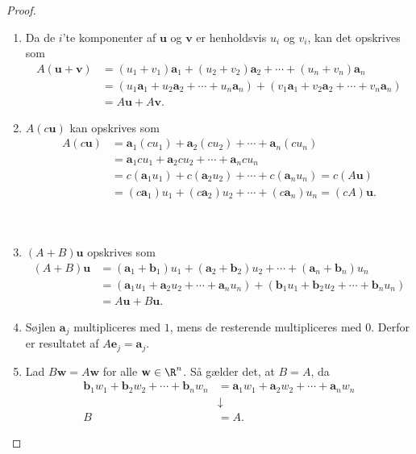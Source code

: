 \begin{proof}
\begin{enumerate}[label=(\alph*)]
\item Da de $i$'te komponenter af $\textbf{u}$ og $\textbf{v}$ er henholdsvis $u_i$ og $v_i$, kan det opskrives som
\begin{align*}
A(\mathbf{u}+\mathbf{v})&=(u_1+v_1)\mathbf{a}_1+(u_2+v_2)\mathbf{a}_2+\cdots + (u_n+v_n)\mathbf{a}_n \\
&=(u_1\mathbf{a}_1+u_2\mathbf{a}_2+\cdots+u_n\mathbf{a}_n)+(v_1\mathbf{a}_1+v_2\mathbf{a}_2+\cdots+v_n\mathbf{a}_n) \\
&=A\mathbf{u}+A\mathbf{v}.
\end{align*}
%
\item $A(c\mathbf{u})$ kan opskrives som
\begin{align*}
A(c \textbf{u})&=\textbf{a}_1(cu_1)+\textbf{a}_2(cu_2) + \cdots + \textbf{a}_n(cu_n) \\
&=\textbf{a}_1cu_1+\textbf{a}_2cu_2 + \cdots + \textbf{a}_ncu_n \\
&=c(\textbf{a}_1u_1)+c(\textbf{a}_2u_2)+\cdots+c(\textbf{a}_n u_n)
=c(A \textbf{u}) \\
&=(c\textbf{a}_1)u_1+(c\textbf{a}_2)u_2+\cdots+(c\textbf{a}_n)u_n=(cA)\textbf{u}.
\end{align*}
\\\\
%
\item $(A+B)\mathbf{u}$ opskrives som
%
\begin{align*}
(A+B)\textbf{u}&=(\textbf{a}_1+\textbf{b}_1)u_1 +(\textbf{a}_2+\textbf{b}_2)u_2 + \cdots + (\textbf{a}_n+\textbf{b}_n)u_n \\
&=(\textbf{a}_1u_1+\textbf{a}_2u_2+ \cdots + \textbf{a}_nu_n)+(\textbf{b}_1u_1+\textbf{b}_2u_2+ \cdots + \textbf{b}_nu_n) \\
&=A\textbf{u}+B\textbf{u}.
\end{align*}
%
\item Søjlen $\mathbf{a}_j$ multipliceres med $1$, mens de resterende multipliceres med $0$. 
Derfor er resultatet af $A\mathbf{e}_j=\mathbf{a}_j.$
%
\item Lad $B\mathbf{w}=A\mathbf{w}$ for alle $\mathbf{w} \in \R^n$.
Så gælder det, at $B=A$, da
%
\begin{align*}
\textbf{b}_1w_1+\textbf{b}_2 w_2+\cdots+\textbf{b}_n w_n &=\textbf{a}_1 w_1+\textbf{a}_2 w_2+\cdots+\textbf{a}_n w_n \\
&\downarrow\\
B&=A.
\end{align*}

\end{enumerate}
\end{proof}
